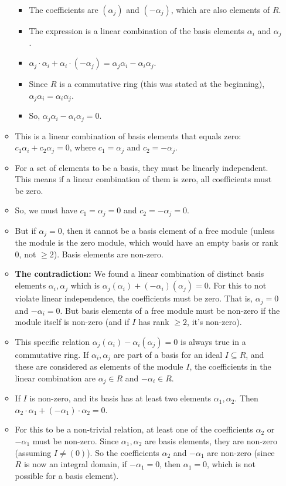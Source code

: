 \begin{itemize}
\begin{itemize}
\begin{itemize}
			\item The coefficients are $(\alpha_j)$ and $(-\alpha_j)$, which are also elements of $R$.
			\item The expression is a linear combination of the basis elements $\alpha_i$ and $\alpha_j$.
			\item $\alpha_j \cdot \alpha_i + \alpha_i \cdot (-\alpha_j) = \alpha_j \alpha_i - \alpha_i \alpha_j$.
			\item Since $R$ is a commutative ring (this was stated at the beginning), $\alpha_j \alpha_i = \alpha_i \alpha_j$.
			\item So, $\alpha_j \alpha_i - \alpha_i \alpha_j = 0$.
		\end{itemize}
		\item This is a linear combination of basis elements that equals zero:
$c_1 \alpha_i + c_2 \alpha_j = 0$, where $c_1 = \alpha_j$ and $c_2 = -\alpha_j$.
		\item For a set of elements to be a basis, they must be linearly independent. This means if a linear combination of them is zero, all coefficients must be zero.
		\item So, we must have $c_1 = \alpha_j = 0$ and $c_2 = -\alpha_j = 0$.
		\item But if $\alpha_j = 0$, then it cannot be a basis element of a free module (unless the module is the zero module, which would have an empty basis or rank 0, not $\ge 2$). Basis elements are non-zero.
		\item \textbf{The contradiction:} We found a linear combination of distinct basis elements $\alpha_i, \alpha_j$ which is $\alpha_j (\alpha_i) + (-\alpha_i) (\alpha_j) = 0$. For this to not violate linear independence, the coefficients must be zero. That is, $\alpha_j=0$ and $-\alpha_i=0$. But basis elements of a free module must be non-zero if the module itself is non-zero (and if $I$ has rank $\ge 2$, it's non-zero).
		\item This specific relation $\alpha_j (\alpha_i) - \alpha_i (\alpha_j) = 0$ is always true in a commutative ring. If $\alpha_i, \alpha_j$ are part of a basis for an ideal $I \subseteq R$, and these are considered as elements of the module $I$, the coefficients in the linear combination are $\alpha_j \in R$ and $-\alpha_i \in R$.
		\item If $I$ is non-zero, and its basis has at least two elements $\alpha_1, \alpha_2$. Then $\alpha_2 \cdot \alpha_1 + (-\alpha_1) \cdot \alpha_2 = 0$.
		\item For this to be a non-trivial relation, at least one of the coefficients $\alpha_2$ or $-\alpha_1$ must be non-zero. Since $\alpha_1, \alpha_2$ are basis elements, they are non-zero (assuming $I \neq (0)$). So the coefficients $\alpha_2$ and $-\alpha_1$ are non-zero (since $R$ is now an integral domain, if $-\alpha_1 = 0$, then $\alpha_1=0$, which is not possible for a basis element).

\end{itemize}
\end{itemize}
